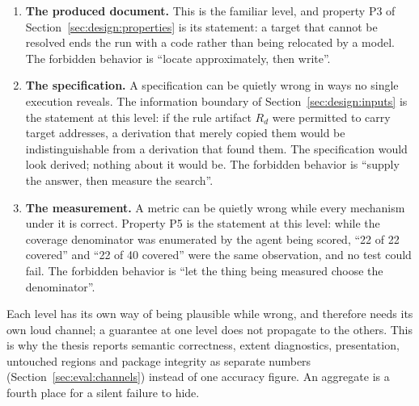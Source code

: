 \begin{enumerate}
  \item \textbf{The produced document.} This is the familiar level, and property P3 of
    Section~\ref{sec:design:properties} is its statement: a target that cannot be resolved
    ends the run with a code rather than being relocated by a model. The forbidden
    behavior is ``locate approximately, then write''.
  \item \textbf{The specification.} A specification can be quietly wrong in ways no
    single execution reveals. The information boundary of
    Section~\ref{sec:design:inputs} is the statement at this level: if the rule artifact
    $R_d$ were permitted to carry target addresses, a derivation that merely copied them
    would be indistinguishable from a derivation that found them. The specification would
    look derived; nothing about it would be. The forbidden behavior is ``supply the
    answer, then measure the search''.
  \item \textbf{The measurement.} A metric can be quietly wrong while every mechanism
    under it is correct. Property P5 is the statement at this level: while the coverage
    denominator was enumerated by the agent being scored, ``22 of 22 covered'' and
    ``22 of 40 covered'' were the same observation, and no test could fail. The forbidden
    behavior is ``let the thing being measured choose the denominator''.
\end{enumerate}

Each level has its own way of being plausible while wrong, and therefore needs its own
loud channel; a guarantee at one level does not propagate to the others. This is why the
thesis reports semantic correctness, extent diagnostics, presentation, untouched regions
and package integrity as separate numbers (Section~\ref{sec:eval:channels}) instead of one
accuracy figure. An aggregate is a fourth place for a silent failure to hide.

